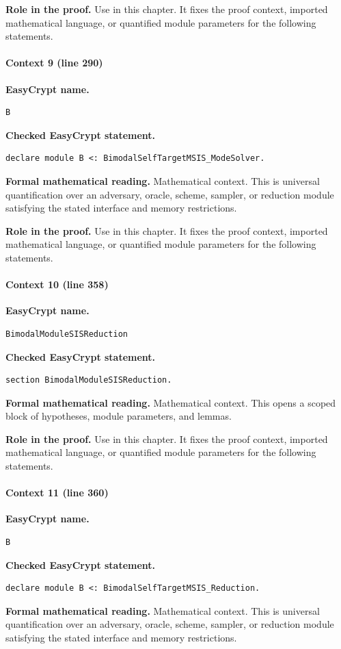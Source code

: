 \noindent\textbf{Role in the proof.}
Use in this chapter. It fixes the proof context, imported mathematical language, or quantified module parameters for the following statements.

\paragraph{Context 9 (line 290)}
\noindent\textbf{EasyCrypt name.}
\begin{lstlisting}[language=EasyCrypt,basicstyle=\ttfamily\scriptsize]
B
\end{lstlisting}
\noindent\textbf{Checked EasyCrypt statement.}
\begin{lstlisting}[language=EasyCrypt,basicstyle=\ttfamily\scriptsize]
declare module B <: BimodalSelfTargetMSIS_ModeSolver.
\end{lstlisting}
\noindent\textbf{Formal mathematical reading.}
Mathematical context. This is universal quantification over an adversary, oracle, scheme, sampler, or reduction module satisfying the stated interface and memory restrictions.

\noindent\textbf{Role in the proof.}
Use in this chapter. It fixes the proof context, imported mathematical language, or quantified module parameters for the following statements.

\paragraph{Context 10 (line 358)}
\noindent\textbf{EasyCrypt name.}
\begin{lstlisting}[language=EasyCrypt,basicstyle=\ttfamily\scriptsize]
BimodalModuleSISReduction
\end{lstlisting}
\noindent\textbf{Checked EasyCrypt statement.}
\begin{lstlisting}[language=EasyCrypt,basicstyle=\ttfamily\scriptsize]
section BimodalModuleSISReduction.
\end{lstlisting}
\noindent\textbf{Formal mathematical reading.}
Mathematical context. This opens a scoped block of hypotheses, module parameters, and lemmas.

\noindent\textbf{Role in the proof.}
Use in this chapter. It fixes the proof context, imported mathematical language, or quantified module parameters for the following statements.

\paragraph{Context 11 (line 360)}
\noindent\textbf{EasyCrypt name.}
\begin{lstlisting}[language=EasyCrypt,basicstyle=\ttfamily\scriptsize]
B
\end{lstlisting}
\noindent\textbf{Checked EasyCrypt statement.}
\begin{lstlisting}[language=EasyCrypt,basicstyle=\ttfamily\scriptsize]
declare module B <: BimodalSelfTargetMSIS_Reduction.
\end{lstlisting}
\noindent\textbf{Formal mathematical reading.}
Mathematical context. This is universal quantification over an adversary, oracle, scheme, sampler, or reduction module satisfying the stated interface and memory restrictions.

